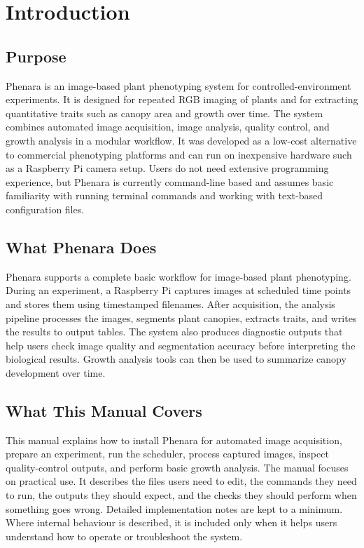 \section{Introduction}

\subsection{Purpose}

Phenara is an image-based plant phenotyping system for controlled-environment
experiments. It is designed for repeated RGB imaging of plants and for
extracting quantitative traits such as canopy area and growth over time. The
system combines automated image acquisition, image analysis, quality control,
and growth analysis in a modular workflow. It was developed as a low-cost
alternative to commercial phenotyping platforms and can run on inexpensive
hardware such as a Raspberry Pi camera setup. Users do not need extensive
programming experience, but Phenara is currently command-line based and assumes
basic familiarity with running terminal commands and working with text-based
configuration files.

\subsection{What Phenara Does}

Phenara supports a complete basic workflow for image-based plant phenotyping.
During an experiment, a Raspberry Pi captures images at scheduled time points
and stores them using timestamped filenames. After acquisition, the analysis
pipeline processes the images, segments plant canopies, extracts traits, and
writes the results to output tables. The system also produces diagnostic
outputs that help users check image quality and segmentation accuracy before
interpreting the biological results. Growth analysis tools can then be used to
summarize canopy development over time.

\subsection{What This Manual Covers}

This manual explains how to install Phenara for automated image acquisition,
prepare an experiment, run the scheduler, process captured images, inspect
quality-control outputs, and perform basic growth analysis. The manual focuses
on practical use. It describes the files users need to edit, the commands they
need to run, the outputs they should expect, and the checks they should perform
when something goes wrong. Detailed implementation notes are kept to a minimum.
Where internal behaviour is described, it is included only when it helps users
understand how to operate or troubleshoot the system.
